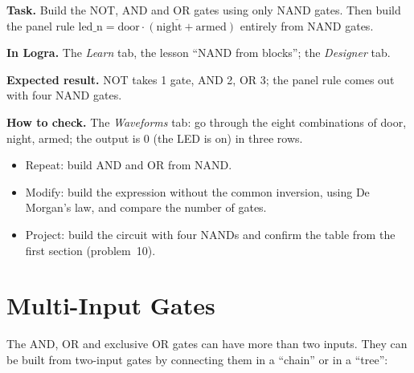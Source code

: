 \begin{diybox}
\textbf{Task.} Build the NOT, AND and OR gates using only NAND gates.
Then build the panel rule $\text{led\_n}=\overline{\text{door}\cdot
(\text{night}+\text{armed})}$ entirely from NAND gates.\par
\textbf{In Logra.} The \emph{Learn} tab, the lesson ``NAND from blocks''; the
\emph{Designer} tab.\par
\textbf{Expected result.} NOT takes 1 gate, AND 2, OR 3; the panel
rule comes out with four NAND gates.\par
\textbf{How to check.} The \emph{Waveforms} tab: go through the eight combinations of
door, night, armed; the output  is 0 (the LED is on) in three
rows.
\begin{itemize}[leftmargin=3.4em,labelwidth=3em,labelsep=0.4em,align=left]
  \item[\stars{1}] Repeat: build AND and OR from NAND.
  \item[\stars{2}] Modify: build the expression without the common inversion, using De Morgan's
    law, and compare the number of gates.
  \item[\stars{3}] Project: build the circuit with four NANDs and confirm the
    table from the first section (problem~10).
\end{itemize}
\end{diybox}

\section{Multi-Input Gates}

The AND, OR and exclusive OR gates can have more than two inputs. They can be
built from two-input gates by connecting them in a ``chain'' or in a ``tree'':

